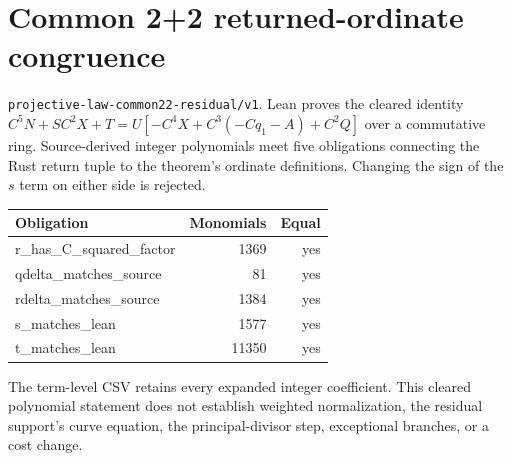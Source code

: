 \documentclass[11pt]{article}
\begin{document}
\section*{Common 2+2 returned-ordinate congruence}
\texttt{projective-law-common22-residual/v1}. Lean proves the cleared
identity $C^5N + SC^2X + T = U[-C^4X + C^3(-Cq_1-A) + C^2Q]$ over a
commutative ring. Source-derived integer polynomials meet five obligations
connecting the Rust return tuple to the theorem's ordinate definitions.
Changing the sign of the $s$ term on either side is rejected.

\begin{center}
\begin{tabular}{lrr}
\toprule
Obligation & Monomials & Equal\\
\midrule
r\_has\_C\_squared\_factor & 1369 & yes\\
qdelta\_matches\_source & 81 & yes\\
rdelta\_matches\_source & 1384 & yes\\
s\_matches\_lean & 1577 & yes\\
t\_matches\_lean & 11350 & yes\\
\bottomrule
\end{tabular}
\end{center}
\noindent The term-level CSV retains every expanded integer coefficient. This
cleared polynomial statement does not establish weighted normalization, the
residual support's curve equation, the principal-divisor step, exceptional
branches, or a cost change.
\end{document}
